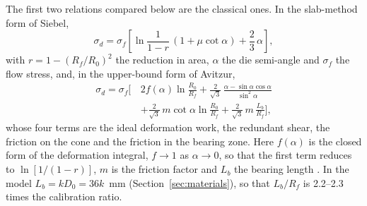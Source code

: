 \documentclass[pdflatex,sn-basic,Numbered]{sn-jnl}
\begin{document}
The first two relations compared below are the classical ones. In the slab-method form of Siebel,
\begin{equation}
\sigma_d = \sigma_f\left[\ln\frac{1}{1-r}\,(1+\mu\cot\alpha) + \frac{2}{3}\,\alpha\right],
\label{eq:siebel}
\end{equation}
with $r = 1-(R_f/R_0)^2$ the reduction in area, $\alpha$ the die semi-angle and $\sigma_f$ the flow
stress, and, in the upper-bound form of Avitzur,
\begin{equation}
\begin{split}
\sigma_d = \sigma_f\biggl[\,&2f(\alpha)\ln\frac{R_0}{R_f}
  + \frac{2}{\sqrt3}\,\frac{\alpha-\sin\alpha\cos\alpha}{\sin^2\alpha}\\
  &+ \frac{2}{\sqrt3}\,m\cot\alpha\ln\frac{R_0}{R_f}
  + \frac{2}{\sqrt3}\,m\,\frac{L_b}{R_f}\biggr],
\end{split}
\label{eq:avitzur}
\end{equation}
whose four terms are the ideal deformation work, the redundant shear, the friction on the cone and
the friction in the bearing zone. Here $f(\alpha)$ is the closed form of the deformation integral,
$f\to1$ as $\alpha\to0$, so that the first
term reduces to $\ln[1/(1-r)]$, $m$ is the friction factor and $L_b$ the bearing length
\citep{siebel1947drahtziehen,avitzur1968metal,avitzur1971study}. In the model
$L_b = kD_0 = 36k$~mm (Section~\ref{sec:materials}), so that $L_b/R_f$ is 2.2--2.3 times the
calibration ratio.
\end{document}
